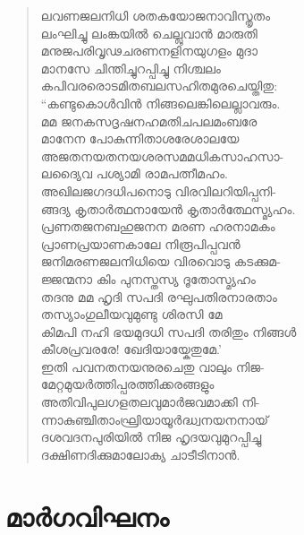 \begin{verse}
ലവണജലനിധി ശതകയോജനാവിസ്തൃതം\\
ലംഘിച്ചു ലംങ്കയില്‍ ചെല്ലുവാന്‍ മാരുതി\\
മനുജപരിവൃഢചരണനളിനയുഗളം മുദാ\\
മാനസേ ചിന്തിച്ചുറപ്പിച്ചു നിശ്ചലം\\
കപിവരരൊടമിതബലസഹിതമുരചെയ്തിതു:\\
“കണ്ടുകൊള്‍വിന്‍ നിങ്ങലെങ്കിലെല്ലാവരും.\\
മമ ജനകസദൃഷനഹമതിചപലമംബരേ\\
മാനേന പോകുന്നിതാശരേശാലയേ\\
അജതനയതനയശരസമമധികസാഹസാ-\\
ലദ്യൈവ പശ്യാമി രാമപത്നീമഹം.\\
അഖിലജഗദധിപനൊടു വിരവിലറിയിപ്പനി-\\
ങ്ങദ്യ കൃതാര്‍ത്ഥനായേന്‍ കൃതാര്‍ത്ഥേസ്മ്യഹം.\\
പ്രണതജനബഹുജനന മരണ ഹരനാമകം\\
പ്രാണപ്രയാണകാലേ നിരൂപിപ്പവന്‍\\
ജനിമരണജലനിധിയെ വിരവൊടു കടക്കുമ-\\
ജ്ജന്മനാ കിം പുനസ്തസ്യ ദൂതോസ്മ്യഹം\\
തദനു മമ ഹൃദി സപദി രഘുപതിരനാരതാം\\
തസ്യാംഗുലീയവുമുണ്ടു ശിരസി മേ\\
കിമപി നഹി ഭയമുദധി സപദി തരിതും നിങ്ങള്‍\\
കീശപ്രവരരേ! ഖേദിയായ്കേതുമേ.’\\
ഇതി പവനതനയനുരചെതു വാലും നിജ-\\
മേറ്റമുയര്‍ത്തിപ്പരത്തിക്കരങ്ങളും\\
അതിവിപുലഗളതലവുമാര്‍ജവമാക്കി നി-\\
ന്നാകുഞ്ചിതാംഘ്രിയായൂര്‍ദ്ധ്വനയനനായ്\\
ദശവദനപുരിയില്‍ നിജ ഹൃദയവുമുറപ്പിച്ചു\\
ദക്ഷിണദിക്കുമാലോക്യ ചാടീടിനാന്‍.
\end{verse}


\section{മാര്‍ഗവിഘനം}

